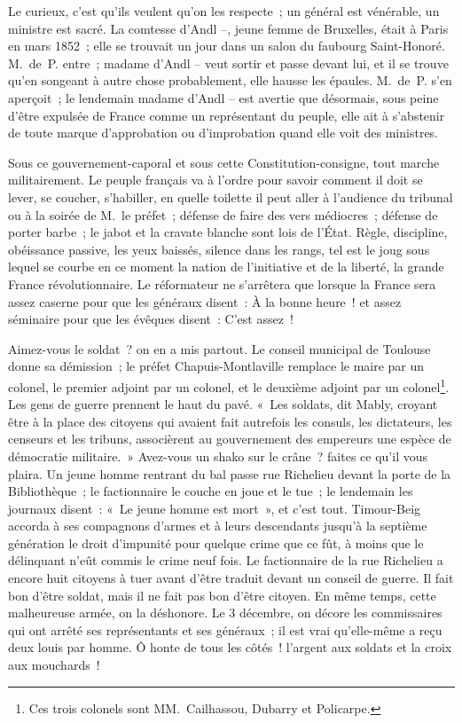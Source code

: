 \documentclass[french,twoside]{book} %
\begin{document}
\noindent Le curieux, c’est qu’ils veulent qu’on les respecte ; un général est vénérable, un ministre est sacré. La comtesse d’Andl –, jeune femme de Bruxelles, était à Paris en mars 1852 ; elle se trouvait un jour dans un salon du faubourg Saint-Honoré. M. de P. entre ; madame d’Andl – veut sortir et passe devant lui, et il se trouve qu’en songeant à autre chose probablement, elle hausse les épaules. M. de P. s’en aperçoit ; le lendemain madame d’Andl – est avertie que désormais, sous peine d’être expulsée de France comme un représentant du peuple, elle ait à s’abstenir de toute marque d’approbation ou d’improbation quand elle voit des ministres.\par
Sous ce gouvernement-caporal et sous cette Constitution-consigne, tout marche militairement. Le peuple français va à l’ordre pour savoir comment il doit se lever, se coucher, s’habiller, en quelle toilette il peut aller à l’audience du tribunal ou à la soirée de M. le préfet ; défense de faire des vers médiocres ; défense de porter barbe ; le jabot et la cravate blanche sont lois de l’État. Règle, discipline, obéissance passive, les yeux baissés, silence dans les rangs, tel est le joug sous lequel se courbe en ce moment la nation de l’initiative et de la liberté, la grande France révolutionnaire. Le réformateur ne s’arrêtera que lorsque la France sera assez caserne pour que les généraux disent : À la bonne heure ! et assez séminaire pour que les évêques disent : C’est assez !\par
Aimez-vous le soldat ? on en a mis partout. Le conseil municipal de Toulouse donne sa démission ; le préfet Chapuis-Montlaville remplace le maire par un colonel, le premier adjoint par un colonel, et le deuxième adjoint par un colonel\footnote{Ces trois colonels sont MM. Cailhassou, Dubarry et Policarpe.}. Les gens de guerre prennent le haut du pavé. « Les soldats, dit Mably, croyant être à la place des citoyens qui avaient fait autrefois les consuls, les dictateurs, les censeurs et les tribuns, associèrent au gouvernement des empereurs une espèce de démocratie militaire. » Avez-vous un shako sur le crâne ? faites ce qu’il vous plaira. Un jeune homme rentrant du bal passe rue Richelieu devant la porte de la Bibliothèque ; le factionnaire le couche en joue et le tue ; le lendemain les journaux disent : « Le jeune homme est mort », et c’est tout. Timour-Beig accorda à ses compagnons d’armes et à leurs descendants jusqu’à la septième génération le droit d’impunité pour quelque crime que ce fût, à moins que le délinquant n’eût commis le crime neuf fois. Le factionnaire de la rue Richelieu a encore huit citoyens à tuer avant d’être traduit devant un conseil de guerre. Il fait bon d’être soldat, mais il ne fait pas bon d’être citoyen. En même temps, cette malheureuse armée, on la déshonore. Le 3 décembre, on décore les commissaires qui ont arrêté ses représentants et ses généraux ; il est vrai qu’elle-même a reçu deux louis par homme. Ô honte de tous les côtés ! l’argent aux soldats et la croix aux mouchards !\par
\end{document}
